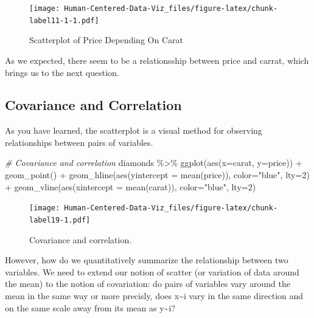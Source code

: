 \documentclass[
]{book}
\newenvironment{Shaded}{\begin{snugshade}}{\end{snugshade}}
\newcommand{\AttributeTok}[1]{\textcolor[rgb]{0.77,0.63,0.00}{#1}}
\newcommand{\CommentTok}[1]{\textcolor[rgb]{0.56,0.35,0.01}{\textit{#1}}}
\newcommand{\DecValTok}[1]{\textcolor[rgb]{0.00,0.00,0.81}{#1}}
\newcommand{\FunctionTok}[1]{\textcolor[rgb]{0.00,0.00,0.00}{#1}}
\newcommand{\NormalTok}[1]{#1}
\newcommand{\SpecialCharTok}[1]{\textcolor[rgb]{0.00,0.00,0.00}{#1}}
\newcommand{\StringTok}[1]{\textcolor[rgb]{0.31,0.60,0.02}{#1}}
\begin{document}
\begin{figure}
\centering
\texttt{[image: Human-Centered-Data-Viz\_files/figure-latex/chunk-label11-1-1.pdf]}
\caption{\label{fig:chunk-label11-1}Scatterplot of Price Depending On Carat}
\end{figure}

As we expected, there seem to be a relationsship between price and carrat, which brings us to the next question.

\hypertarget{covariance-and-correlation}{%
\subsection{Covariance and Correlation}\label{covariance-and-correlation}}

As you have learned, the scatterplot is a visual method for observing relationships between pairs of variables.

\begin{Shaded}
\begin{Highlighting}[]
\CommentTok{\# Covariance and correlation}
\NormalTok{diamonds }\SpecialCharTok{\%\textgreater{}\%}
  \FunctionTok{ggplot}\NormalTok{(}\FunctionTok{aes}\NormalTok{(}\AttributeTok{x=}\NormalTok{carat, }\AttributeTok{y=}\NormalTok{price)) }\SpecialCharTok{+}
  \FunctionTok{geom\_point}\NormalTok{() }\SpecialCharTok{+}
  \FunctionTok{geom\_hline}\NormalTok{(}\FunctionTok{aes}\NormalTok{(}\AttributeTok{yintercept =} \FunctionTok{mean}\NormalTok{(price)), }\AttributeTok{color=}\StringTok{"blue"}\NormalTok{, }\AttributeTok{lty=}\DecValTok{2}\NormalTok{) }\SpecialCharTok{+}
  \FunctionTok{geom\_vline}\NormalTok{(}\FunctionTok{aes}\NormalTok{(}\AttributeTok{xintercept =} \FunctionTok{mean}\NormalTok{(carat)), }\AttributeTok{color=}\StringTok{"blue"}\NormalTok{, }\AttributeTok{lty=}\DecValTok{2}\NormalTok{)}
\end{Highlighting}
\end{Shaded}

\begin{figure}
\centering
\texttt{[image: Human-Centered-Data-Viz\_files/figure-latex/chunk-label19-1.pdf]}
\caption{\label{fig:chunk-label19}Covariance and correlation.}
\end{figure}

However, how do we quantitatively summarize the relationship between two variables. We need to extend our notion of scatter (or variation of data around the mean) to the notion of covariation: do pairs of variables vary around the mean in the same way or more precisly, does x\textasciitilde i vary in the same direction and on the same scale away from its mean as y\textasciitilde i?
\end{document}
